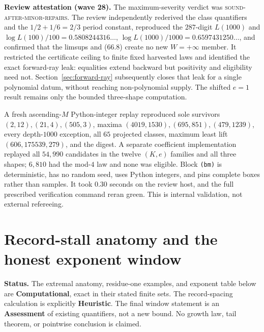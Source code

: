 \documentclass[10pt,reqno]{amsart}
\theoremstyle{definition}
\newcommand{\1}{\mathbf 1}
\begin{document}
\medskip\noindent\textbf{Review attestation (wave 28).}
The maximum-severity verdict was \textsc{sound-after-minor-repairs}.  The
review independently rederived the class quantifiers and the
$1/2+1/6=2/3$ period constant, reproduced the $287$-digit $L(1000)$ and
$\log L(100)/100=0.5808244316\ldots$,
$\log L(1000)/1000=0.6597431250\ldots$, and confirmed that the limsups and
(66.8) create no new $W=+\infty$ member.  It restricted the certificate
ceiling to finite fixed harvested laws and identified the exact
forward-ray leak: equalities extend backward but positivity and eligibility
need not.  Section~\ref{sec:forward-ray} subsequently closes that leak for a
single polynomial datum, without reaching non-polynomial supply.  The
shifted $e=1$ result remains only the bounded three-shape computation.

A fresh ascending-$M$ Python-integer replay reproduced sole survivors
$(2,12),(21,4),(505,3)$, maxima
$(4019,1530),(695,851),(479,1239)$, every depth-$1000$ exception, all $65$
projected classes, maximum least lift $(606,175539,279)$, and the digest.
A separate coefficient implementation replayed all $54{,}990$ candidates in
the twelve $(K,e)$ families and all three shapes; $6{,}810$ had the mod-$4$
law and none was eligible.  Block \texttt{(bm)} is deterministic, has no
random seed, uses Python integers, and pins complete boxes rather than
samples.  It took $0.30$ seconds on the review host, and the full prescribed
verification command reran green.  This is internal validation, not external
refereeing.

\section{Record-stall anatomy and the honest exponent window}
\label{sec:record-stall}
\medskip\noindent\textbf{Status.}
The extremal anatomy, residue-one examples, and exponent table below are
\textbf{Computational}, exact in their stated finite sets.  The record-spacing
calculation is explicitly \textbf{Heuristic}.  The final window statement is
an \textbf{Assessment} of existing quantifiers, not a new bound.  No growth
law, tail theorem, or pointwise conclusion is claimed.
\end{document}
